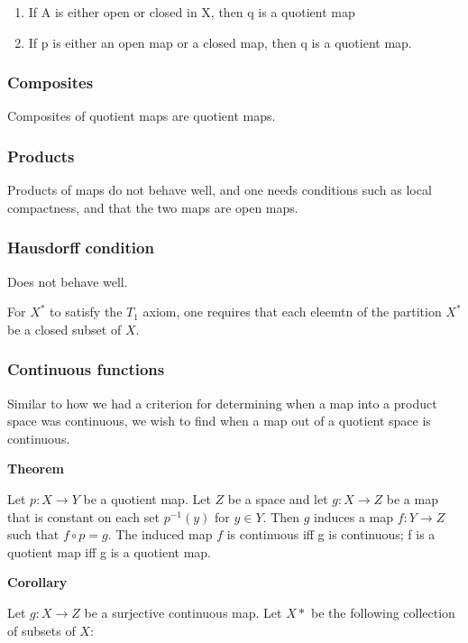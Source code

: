 \documentclass[11pt]{article}
\begin{document}
\begin{enumerate}
\item If A is either open or closed in X, then q is a quotient map
\item If p is either an open map or a closed map, then q is a quotient map.
\end{enumerate}


\subsubsection{Composites}
\label{sec:org9fa573a}

Composites of quotient maps are quotient maps.

\subsubsection{Products}
\label{sec:org2a6e449}

Products of maps do not behave well, and one needs conditions such as local compactness, and that the two maps are open maps.

\subsubsection{Hausdorff condition}
\label{sec:org9071500}

Does not behave well.

For \(X^*\) to satisfy the \(T_1\) axiom, one requires that each eleemtn of the partition \(X^*\) be a closed subset of \(X\).


\subsubsection{Continuous functions}
\label{sec:orge599d90}

Similar to how we had a criterion for determining when a map into a product space was continuous, we wish to find when a map out of a quotient space is continuous.

\textbf{Theorem}

Let \(p:X\to Y\) be a quotient map. Let \(Z\) be a space and let \(g : X \to Z\) be a map that is constant on each set \(p^{-1}({y})\) for \(y \in Y\). Then \(g\) induces a map \(f : Y \to Z\) such that \(f \circ p = g\). The induced map \(f\) is continuous iff g is continuous; f is a quotient map iff g is a quotient map.

\textbf{Corollary}

Let \(g : X \to Z\) be a surjective continuous map. Let \(X*\) be the following collection of subsets of \(X\):
\end{document}
